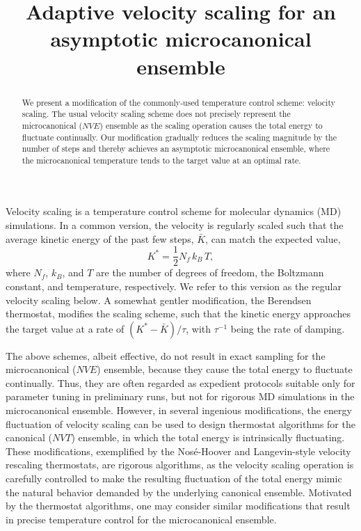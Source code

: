 \documentclass[preprint]{revtex4-1}
\begin{document}
\title{Adaptive velocity scaling for an asymptotic
microcanonical ensemble}
\author{}
\begin{abstract}
  We present a modification of the commonly-used
  temperature control scheme: velocity scaling.
  The usual velocity scaling scheme does not precisely represent
  the microcanonical ($NVE$) ensemble
  as the scaling operation causes the total energy to fluctuate continually.
  Our modification gradually reduces the scaling magnitude
  by the number of steps
  and thereby achieves an asymptotic microcanonical ensemble,
  where the microcanonical temperature tends to the target value
  at an optimal rate.
\end{abstract}

\maketitle



Velocity scaling is a temperature control scheme
for molecular dynamics (MD) simulations.
%
In a common version,
the velocity is regularly scaled such that the average
kinetic energy of the past few steps, $\bar K$,
can match the expected value\cite{frenkel},
%
\begin{equation}
  K^* = \frac{1}{2} N_f \, k_B \, T
  ,
  \label{eq:K_canon}
\end{equation}
%
where $N_f$, $k_B$, and $T$ are the number of degrees of freedom,
the Boltzmann constant, and temperature, respectively.
%
We refer to this version as the regular velocity scaling below.
%
A somewhat gentler modification, the Berendsen thermostat\cite{berendsen1984},
modifies the scaling scheme, such that
the kinetic energy approaches the target value at a rate of
$\left( K^* - \bar K \right)/\tau$,
with $\tau^{-1}$ being the rate of damping.

The above schemes, albeit effective,
do not result in exact sampling for the microcanonical ($NVE$) ensemble\cite{hermansson1988},
because they cause the total energy to fluctuate continually.
%
Thus, they are often regarded as expedient protocols
suitable only for parameter tuning in preliminary runs,
but not for rigorous MD simulations in the microcanonical ensemble.
%
However, in several ingenious modifications,
the energy fluctuation of velocity scaling
can be used to design thermostat algorithms
for the canonical ($NVT$) ensemble, in which the total energy
is intrinsically fluctuating.
%
These modifications,
exemplified by the Nos\'e-Hoover\cite{nose1984, nose1984mp, hoover1985, martyna1992}
and Langevin-style velocity rescaling\cite{bussi2007} thermostats,
are rigorous algorithms, as
the velocity scaling operation is carefully
controlled to make
the resulting fluctuation of the total energy
mimic the natural behavior demanded by the underlying canonical ensemble.
%
Motivated by the thermostat algorithms,
one may consider similar modifications
that result in precise temperature control
for the microcanonical ensemble.
\end{document}
